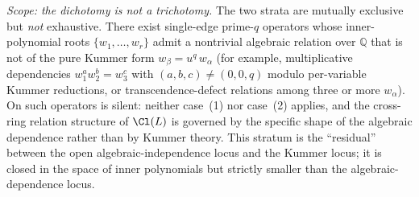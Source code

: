 
\smallskip
\textit{Scope: the dichotomy is not a trichotomy.}
The two strata are mutually exclusive but \emph{not} exhaustive. There
exist single-edge prime-$q$ operators whose inner-polynomial roots
$\{w_1, \dots, w_r\}$ admit a nontrivial algebraic relation over
$\mathbb{Q}$ that is not of the pure Kummer form $w_\beta = u^q\,
w_\alpha$ (for example, multiplicative dependencies $w_1^a w_2^b =
w_3^c$ with $(a, b, c) \ne (0, 0, q)$ modulo per-variable Kummer
reductions, or transcendence-defect relations among three or more
$w_\alpha$). On such operators  is silent: neither
case~(1) nor case~(2) applies, and the cross-ring relation structure
of $\Cl(L)$ is governed by the specific shape of the algebraic
dependence rather than by Kummer theory. This stratum is the
``residual'' between the open algebraic-independence locus and the
Kummer locus; it is closed in the space of inner polynomials but
strictly smaller than the algebraic-dependence locus.

